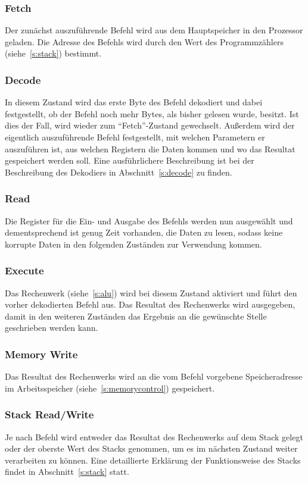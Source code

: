 \subsubsection{Fetch}
Der zunächst auszuführende Befehl wird aus dem Hauptspeicher in den Prozessor
geladen. Die Adresse des Befehls wird durch den Wert des Programmzählers
(siehe~\ref{s:stack}) bestimmt.
\subsubsection{Decode}
In diesem Zustand wird das erste Byte des Befehl dekodiert und dabei
festgestellt, ob der Befehl noch mehr Bytes, als bisher gelesen wurde, besitzt.
Ist dies der Fall, wird wieder zum "`Fetch"'-Zustand gewechselt. Außerdem wird der
eigentlich auszuführende Befehl festgestellt, mit welchen Parametern er
auszuführen ist, aus welchen Registern die Daten kommen und wo das Resultat
gespeichert werden soll. Eine ausführlichere Beschreibung ist bei der
Beschreibung des Dekodiers in Abschnitt~\ref{s:decode} zu finden.
\subsubsection{Read}
Die Register für die Ein- und Ausgabe des Befehls werden nun ausgewählt und
dementsprechend ist genug Zeit vorhanden, die Daten zu lesen, sodass keine
korrupte Daten in den folgenden Zuständen zur Verwendung kommen.
\subsubsection{Execute}
Das Rechenwerk (siehe~\ref{s:alu}) wird bei diesem Zustand aktiviert und führt
den vorher dekodierten Befehl aus. Das Resultat des Rechenwerks wird ausgegeben,
damit in den weiteren Zuständen das Ergebnis an die gewünschte Stelle
geschrieben werden kann.
\subsubsection{Memory Write}
Das Resultat des Rechenwerks wird an die vom Befehl vorgebene Speicheradresse im
Arbeitsspeicher (siehe~\ref{s:memorycontrol}) gespeichert.
\subsubsection{Stack Read/Write}
Je nach Befehl wird entweder das Resultat des Rechenwerks auf dem Stack gelegt
oder der oberste Wert des Stacks genommen, um es im nächsten Zustand weiter
verarbeiten zu können. Eine detaillierte Erklärung der Funktionsweise des Stacks
findet in Abschnitt~\ref{s:stack} statt.
